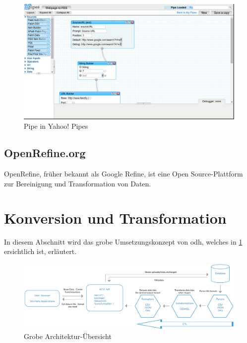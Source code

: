\begin{figure}[H]
    \centering
    \includegraphics[width=2\linewidth/3]{fig/yahoo-pipes}
    \caption{Pipe in Yahoo! Pipes}
\end{figure}

\subsection{OpenRefine.org}
OpenRefine, früher bekannt als Google Refine, ist eine Open Source-Plattform zur Bereinigung und Transformation von Daten.

\section{Konversion und Transformation}

In diesem Abschnitt wird das grobe Umsetzungskonzept von \gls{odh}, welches in \cref{fig:tb:arch-overview} ersichtlich ist, erläutert.
\begin{figure}[H]
    \centering
    \includegraphics[width=\linewidth]{../projektdokumentation/fig/ODH-Architecture-Overview}
    \caption{Grobe Architektur-Übersicht}
    \label{fig:tb:arch-overview}
\end{figure}

